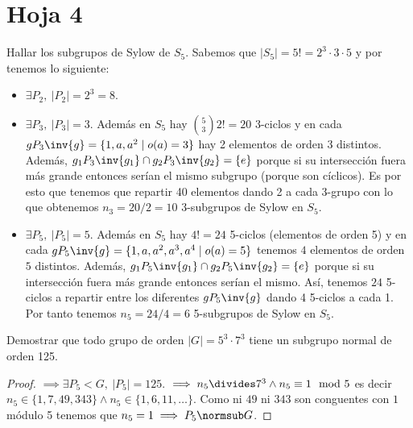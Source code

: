 \section{Hoja 4}

\begin{ex}[H4.11] Hallar los subgrupos de Sylow de $S_5$.
	Sabemos que $|S_5| = 5! = 2^3\cdot3\cdot 5$ y por  tenemos lo siguiente:
	\begin{itemize}
		\item $\exists P_2,\ |P_2| = 2^3 = 8$.
		\item $\exists P_3,\ |P_3| = 3$. Además en $S_5$ hay $\binom{5}{3}2! =20 $ 3-ciclos y en cada $gP_3\inv{g} = \{1, a, a^2 \mid o(a) = 3\}$ hay 2 elementos de orden 3 distintos. Además, $g_1P_3\inv{g_1} \cap g_2P_3\inv{g_2} = \{e\}$ porque si su intersección fuera más grande entonces serían el mismo subgrupo (porque son cíclicos). Es por esto que tenemos que repartir 40 elementos dando 2 a cada 3-grupo con lo que obtenemos $n_3 = 20 / 2 = 10$ 3-subgrupos de Sylow en $S_5$.
		\item $\exists P_5,\ |P_5| = 5$. Además en $S_5$ hay $4! = 24$ 5-ciclos (elementos de orden 5) y en cada $gP_5\inv{g} = \{1, a, a^2, a^3, a^4 \mid o(a) = 5\}$ tenemos $4$ elementos de orden $5$ distintos. Además, $g_1P_5\inv{g_1} \cap g_2P_5\inv{g_2} = \{e\}$ porque si su intersección fuera más grande entonces serían el mismo. Así, tenemos $24$ 5-ciclos a repartir entre los diferentes $gP_5\inv{g}$ dando 4 5-ciclos a cada 1. Por tanto tenemos $n_5 = 24/4 = 6$ 5-subgrupos de Sylow en $S_5$.
	\end{itemize}
\end{ex}

\begin{ex}[H4.18]
	Demostrar que todo grupo de orden $|G| = 5^3 \cdot 7^3$ tiene un subgrupo normal de orden 125.
	
	\begin{proof}
		 $\implies \exists P_5 < G,\ |P_5| = 125$.  $\implies n_5 \divides 7^3 \land n_5 \equiv 1 \mod 5$ es decir $n_5 \in \{1, 7, 49, 343\} \land n_5 \in \{1, 6, 11, \dots\}$. Como ni $49$ ni $343$ son conguentes con $1$ módulo 5 tenemos que $n_5 = 1 \implies P_5 \normsub G$.
	\end{proof}
\end{ex}

